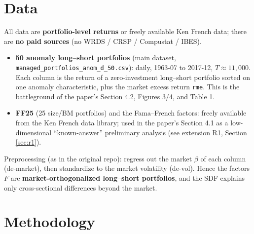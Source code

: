 \documentclass[11pt,a4paper]{article}
\begin{document}
\section{Data}
All data are \textbf{portfolio-level returns} or freely available Ken French data; there are \textbf{no paid
sources} (no WRDS / CRSP / Compustat / IBES).
\begin{itemize}
  \item \textbf{50 anomaly long--short portfolios} (main dataset,
  \texttt{managed\_\allowbreak portfolios\_\allowbreak anom\_\allowbreak d\_50.csv}):
  daily, 1963-07 to 2017-12, $T\approx 11{,}000$. Each column is the return of a zero-investment long--short
  portfolio sorted on one anomaly characteristic, plus the market excess return \texttt{rme}. This is the
  battleground of the paper's Section 4.2, Figures 3/4, and Table 1.
  \item \textbf{FF25} (25 size/BM portfolios) and the Fama--French factors: freely available from the Ken French
  data library; used in the paper's Section 4.1 as a low-dimensional ``known-answer'' preliminary analysis
  (see extension R1, Section \ref{sec:r1}).
\end{itemize}
Preprocessing (as in the original repo): regress out the market $\beta$ of each column (de-market), then
standardize to the market volatility (de-vol). Hence the factors $F$ are \textbf{market-orthogonalized long--short
portfolios}, and the SDF explains only cross-sectional differences beyond the market.

\section{Methodology}\label{sec:method}
\end{document}
